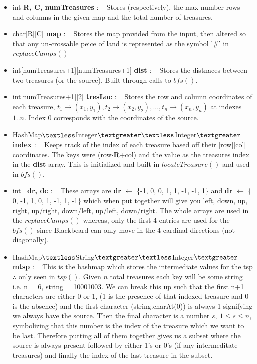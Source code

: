 \documentclass[12pt]{article}
\begin{document}
\begin{itemize}
    \item int \textbf{R, C, numTreasures} : ~ Stores (respectively), the max number rows and columns
     in the given map and the total number of treasures.
    \item char[R][C] \textbf{map} : ~ Stores the map provided from the input, then altered so that any
        un-crossable peice of land is represented as the symbol '\#' in $replaceCamps()$
    \item int[numTreasures+1][numTreasures+1] \textbf{dist} : ~ Stores the distnaces between two treasures
        (or the source). Built through calls to $bfs()$.
    \item int[numTreasures+1][2] \textbf{tresLoc} : ~ Stores the row and column coordinates of each
        treasure, $t_1\rightarrow(x_1,y_1), t_2\rightarrow(x_2,y_2), ..., t_n\rightarrow(x_n,y_n)$ at
        indexes $1..n$. Index 0 corresponds with the coordinates of the source.
    \item HashMap$\textless$Integer$\textgreater\textless$Integer$\textgreater$ \textbf{index} : ~
        Keeps track of the index of each treasure based off their [row][col] coordinates. The keys
        were (row$\cdot$\textbf{R}+col) and the value as the treasures index in the \textbf{dist} array.
        This is initialized and built in $locateTreasure()$ and used in $bfs()$.
    \item int[] \textbf{dr, dc} : ~ These arrays are \textbf{dr} $\gets$ \{-1,  0, 0, 1, 1, -1, -1,  1\}
        and \textbf{dr} $\gets$ \{ 0, -1, 1, 0, 1, -1,  1, -1\} which when put together will give you
        left, down, up, right, up/right, down/left, up/left, down/right. The whole arrays are used in the
        $replaceCamps()$ whereas, only the first 4 entries are used for the $bfs()$ since Blackbeard can
        only move in the 4 cardinal directions (not diagonally).
    \item HashMap$\textless$String$\textgreater\textless$Integer$\textgreater$ \textbf{mtsp} : ~ This is
        the hashmap which stores the intermediate values for the tsp $\therefore$ only seen in $tsp()$.
        Given $n$ total treasures each key will be some string i.e. n = 6, string = 10001003. We can break
        this up such that the first n+1 characters are either 0 or 1, (1 is the presence of that indexed
        treasure and 0 is the absence) and the first character (string.charAt(0)) is always 1 signifying
        we always have the source. Then the final character is a number $s,\ 1\leq s\leq n$, symbolizing
        that this number is the index of the treasure which we want to be last. Therefore putting all of
        them together gives us a subset where the source is always present followed by either 1's or 0's
        (if any intermeditate treasures) and finally the index of the last treasure in the subset.
\end{itemize}
\end{document}
